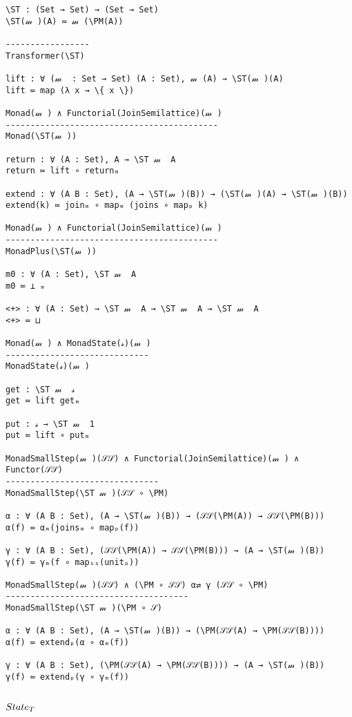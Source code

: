 \documentclass{article}
\begin{document}
\begin{verbatim}
\ST : (Set → Set) → (Set → Set)
\ST(𝓂 )(A) ≔ 𝓂 (\PM(A))

-----------------
Transformer(\ST)

lift : ∀ (𝓂  : Set → Set) (A : Set), 𝓂 (A) → \ST(𝓂 )(A)
lift ≔ map (λ x → \{ x \})

Monad(𝓂 ) ∧ Functorial(JoinSemilattice)(𝓂 )
-------------------------------------------
Monad(\ST(𝓂 ))

return : ∀ (A : Set), A → \ST 𝓂  A
return ≔ lift ∘ returnₘ

extend : ∀ (A B : Set), (A → \ST(𝓂 )(B)) → (\ST(𝓂 )(A) → \ST(𝓂 )(B))
extend(k) ≔ joinₘ ∘ mapₘ (joins ∘ mapₚ k)

Monad(𝓂 ) ∧ Functorial(JoinSemilattice)(𝓂 )
-------------------------------------------
MonadPlus(\ST(𝓂 ))

m0 : ∀ (A : Set), \ST 𝓂  A
m0 ≔ ⊥ ₘ

<+> : ∀ (A : Set) → \ST 𝓂  A → \ST 𝓂  A → \ST 𝓂  A
<+> ≔ ⊔

Monad(𝓂 ) ∧ MonadState(𝓈)(𝓂 )
-----------------------------
MonadState(𝓈)(𝓂 )

get : \ST 𝓂  𝓈
get ≔ lift getₘ

put : 𝓈 → \ST 𝓂  1
put ≔ lift ∘ putₘ

MonadSmallStep(𝓂 )(𝒮𝒮) ∧ Functorial(JoinSemilattice)(𝓂 ) ∧ Functor(𝒮𝒮)
-------------------------------
MonadSmallStep(\ST 𝓂 )(𝒮𝒮 ∘ \PM)

α : ∀ (A B : Set), (A → \ST(𝓂 )(B)) → (𝒮𝒮(\PM(A)) → 𝒮𝒮(\PM(B)))
α(f) ≔ αₘ(joinsₘ ∘ mapₚ(f))

γ : ∀ (A B : Set), (𝒮𝒮(\PM(A)) → 𝒮𝒮(\PM(B))) → (A → \ST(𝓂 )(B))
γ(f) ≔ γₘ(f ∘ mapₛₛ(unitₚ))

MonadSmallStep(𝓂 )(𝒮𝒮) ∧ (\PM ∘ 𝒮𝒮) α⇄ γ (𝒮𝒮 ∘ \PM)
-------------------------------------
MonadSmallStep(\ST 𝓂 )(\PM ∘ 𝒮)

α : ∀ (A B : Set), (A → \ST(𝓂 )(B)) → (\PM(𝒮𝒮(A) → \PM(𝒮𝒮(B))))
α(f) ≔ extendₚ(α ∘ αₘ(f))

γ : ∀ (A B : Set), (\PM(𝒮𝒮(A) → \PM(𝒮𝒮(B)))) → (A → \ST(𝓂 )(B))
γ(f) ≔ extendₚ(γ ∘ γₘ(f))
\end{verbatim}



\subsection{$State_T$}
\label{section:Proofs+Definitions:StateT}
\end{document}
